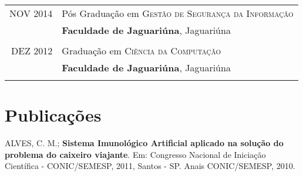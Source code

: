 \documentclass[a4paper,10pt]{article} %
\begin{document}
\begin{tabular}{rl}	
\textsc{NOV} 2014 & Pós Graduação em \textsc{Gestão de Segurança da Informação} \\& \normalsize\textbf{Faculdade de Jaguariúna}, Jaguariúna\\
&\\


\textsc{DEZ} 2012& Graduação em \textsc{}\textsc{Ciência da Computação} \\& \normalsize\textbf{Faculdade de Jaguariúna}, Jaguariúna\\
&\\




\end{tabular}


\section{Publicações}

ALVES, C. M.; \textbf{Sistema Imunológico Artificial aplicado na solução do problema do caixeiro viajante}. Em: Congresso Nacional de Iniciação Científica - CONIC/SEMESP, 2011, Santos - SP. Anais CONIC/SEMESP, 2010.
\end{document}
